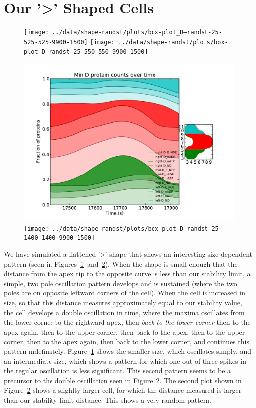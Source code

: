 \documentclass[letterpaper,twocolumn,amsmath,amssymb,pre]{revtex4-1}
\begin{document}
\section{Our '\textgreater' Shaped Cells}
\begin{figure}
  \texttt{[image: ../data/shape-randst/plots/box-plot\_D--randst-25-525-525-9900-1500]}
  \texttt{[image: ../data/shape-randst/plots/box-plot\_D--randst-25-550-550-9900-1500]}
  \label{>-box}
\end{figure}
\begin{figure}
  \includegraphics[width=\columnwidth]{../data/shape-randst/plots/box-plot_D--randst-25-600-600-9900-1500}
  \texttt{[image: ../data/shape-randst/plots/box-plot\_D--randst-25-1400-1400-9900-1500]}
  \label{>-box2}
\end{figure}

We have simulated a flattened '>' shape that shows an interesting size
dependent pattern (seen in Figures~\ref{>-box}~and~\ref{>-box2}).
When the shape is small enough that the distance from the apex tip to
the opposite curve is less than our stability limit, a simple, two
pole oscillation pattern develops and is sustained (where the two
poles are on opposite leftward corners of the cell).  When the cell is
increased in size, so that this distance measures approximately equal
to our stability value, the cell develops a double oscillation in
time, where the maxima oscillates from the lower corner to the
rightward apex, then \emph{back to the lower corner} then to the apex
again, then to the upper corner, then back to the apex, then to the
upper corner, then to the apex again, then back to the lower corner,
and continues this pattern indefinately.  Figure~\ref{>-box} shows the
smaller size, which oscillates simply, and an intermediate size, which
shows a pattern for which one out of three spikes in the regular
oscillation is less significant.  This second pattern seems to be a
precursor to the double oscillation seen in Figure~\ref{>-box2}.  The
second plot shown in Figure~\ref{>-box2} shows a slighlty larger cell,
for which the distance measured is larger than our stability limit
distance.  This shows a very random pattern.
\end{document}

